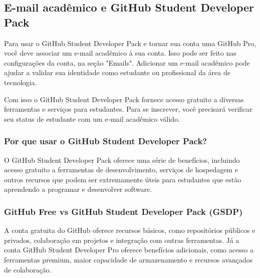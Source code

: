 \subsection{E-mail acadêmico e GitHub Student Developer Pack}
Para usar o GitHub Student Developer Pack e tornar sua conta uma GitHub Pro, você deve associar um e-mail acadêmico à sua conta. Isso pode ser feito nas configurações da conta, na seção "Emails". Adicionar um e-mail acadêmico pode ajudar a validar sua identidade como estudante ou profissional da área de tecnologia.
\par
Com isso o GitHub Student Developer Pack fornece acesso gratuito a diversas ferramentas e serviços para estudantes. Para se inscrever, você precisará verificar seu status de estudante com um e-mail acadêmico válido.
\par
\subsubsection{Por que usar o GitHub Student Developer Pack?}
O GitHub Student Developer Pack oferece uma série de benefícios, incluindo acesso gratuito a ferramentas de desenvolvimento, serviços de hospedagem e outros recursos que podem ser extremamente úteis para estudantes que estão aprendendo a programar e desenvolver software.
\par
\subsubsection{GitHub Free vs GitHub Student Developer Pack (GSDP)}
A conta gratuita do GitHub oferece recursos básicos, como repositórios públicos e privados, colaboração em projetos e integração com outras ferramentas. Já a conta GitHub Student Developer Pro oferece benefícios adicionais, como acesso a ferramentas premium, maior capacidade de armazenamento e recursos avançados de colaboração.
\par
\newpage
